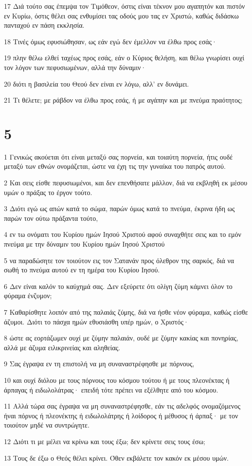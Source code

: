\par 17 Διά τούτο σας έπεμψα τον Τιμόθεον, όστις είναι τέκνον μου αγαπητόν και πιστόν εν Κυρίω, όστις θέλει σας ενθυμίσει τας οδούς μου τας εν Χριστώ, καθώς διδάσκω πανταχού εν πάση εκκλησία.
\par 18 Τινές όμως εφυσιώθησαν, ως εάν εγώ δεν έμελλον να έλθω προς εσάς·
\par 19 πλην θέλω ελθεί ταχέως προς εσάς, εάν ο Κύριος θελήση, και θέλω γνωρίσει ουχί τον λόγον των πεφυσιωμένων, αλλά την δύναμιν·
\par 20 διότι η βασιλεία του Θεού δεν είναι εν λόγω, αλλ' εν δυνάμει.
\par 21 Τι θέλετε; με ράβδον να έλθω προς εσάς, ή με αγάπην και με πνεύμα πραότητος;

\chapter{5}

\par 1 Γενικώς ακούεται ότι είναι μεταξύ σας πορνεία, και τοιαύτη πορνεία, ήτις ουδέ μεταξύ των εθνών ονομάζεται, ώστε να έχη τις την γυναίκα του πατρός αυτού.
\par 2 Και σεις είσθε πεφυσιωμένοι, και δεν επενθήσατε μάλλον, διά να εκβληθή εκ μέσου υμών ο πράξας το έργον τούτο.
\par 3 Διότι εγώ ως απών κατά το σώμα, παρών όμως κατά το πνεύμα, έκρινα ήδη ως παρών τον ούτω πράξαντα τούτο,
\par 4 εν τω ονόματι του Κυρίου ημών Ιησού Χριστού αφού συναχθήτε σεις και το εμόν πνεύμα με την δύναμιν του Κυρίου ημών Ιησού Χριστού
\par 5 να παραδώσητε τον τοιούτον εις τον Σατανάν προς όλεθρον της σαρκός, διά να σωθή το πνεύμα αυτού εν τη ημέρα του Κυρίου Ιησού.
\par 6 Δεν είναι καλόν το καύχημά σας. Δεν εξεύρετε ότι ολίγη ζύμη κάμνει όλον το φύραμα ένζυμον;
\par 7 Καθαρίσθητε λοιπόν από της παλαιάς ζύμης, διά να ήσθε νέον φύραμα, καθώς είσθε άζυμοι. Διότι το πάσχα ημών εθυσιάσθη υπέρ ημών, ο Χριστός·
\par 8 ώστε ας εορτάζωμεν ουχί με ζύμην παλαιάν, ουδέ με ζύμην κακίας και πονηρίας, αλλά με άζυμα ειλικρινείας και αληθείας.
\par 9 Σας έγραψα εν τη επιστολή να μη συναναστρέφησθε με πόρνους,
\par 10 και ουχί διόλου με τους πόρνους του κόσμου τούτου ή με τους πλεονέκτας ή άρπαγας ή ειδωλολάτρας· επειδή τότε πρέπει να εξέλθητε από του κόσμου.
\par 11 Αλλά τώρα σας έγραψα να μη συναναστρέφησθε, εάν τις αδελφός ονομαζόμενος ήναι πόρνος ή πλεονέκτης ή ειδωλολάτρης ή λοίδορος ή μέθυσος ή άρπαξ· με τον τοιούτον μηδέ να συντρώγητε.
\par 12 Διότι τι με μέλει να κρίνω και τους έξω; δεν κρίνετε σεις τους έσω;
\par 13 Τους δε έξω ο Θεός θέλει κρίνει. Όθεν εκβάλετε τον κακόν εκ μέσου υμών.

